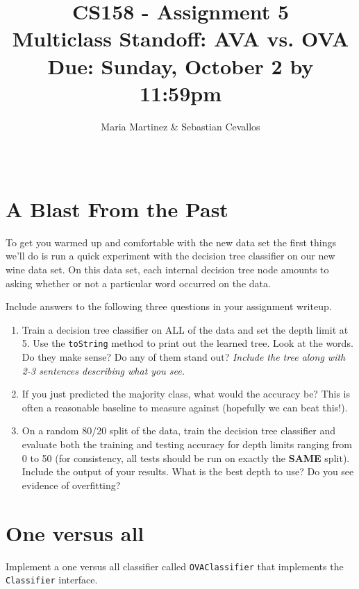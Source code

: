 \documentclass[11pt]{article}
\title{CS158 - Assignment 5\\Multiclass Standoff: AVA vs. OVA\\\small{Due: Sunday, October 2 by 11:59pm}}
\author{Maria Martinez \& Sebastian Cevallos}
\date{\ }
\begin{document}
\maketitle

\vspace{-0.8in}


\section{A Blast From the Past}

To get you warmed up and comfortable with the new data set the first things we'll do is run a quick experiment with the decision tree classifier on our new wine data set.  On this data set, each internal decision tree node amounts to asking whether or not a particular word occurred on the data.

Include answers to the following three questions in your assignment writeup.

\begin{enumerate}

\item Train a decision tree classifier on ALL of the data and set the depth limit at 5. Use the \texttt{toString} method to print out the learned tree.  Look at the words.  Do they make sense?  Do any of them stand out?  \emph{Include the tree along with 2-3 sentences describing what you see.}

\item If you just predicted the majority class, what would the accuracy be?  This is often a reasonable baseline to measure against (hopefully we can beat this!).

\item On a random 80/20 split of the data, train the decision tree classifier and evaluate both the training and testing accuracy for depth limits ranging from 0 to 50 (for consistency, all tests should be run on exactly the \textbf{SAME} split).  Include the output of your results.  What is the best depth to use?  Do you see evidence of overfitting?

\end{enumerate}

\section{One versus all}

Implement a one versus all classifier called \texttt{OVAClassifier} that implements the \texttt{Classifier} interface.
\end{document}
